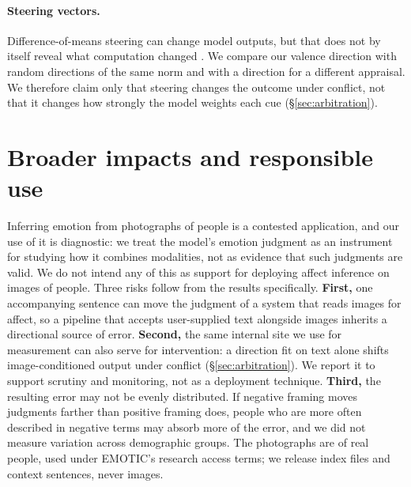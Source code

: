 \documentclass{article}
\begin{document}
\paragraph{Steering vectors.}
Difference-of-means steering can change model outputs, but that does not by itself reveal what computation changed \citep{steeringunreliability2025, steeringnonident2026}. We compare our valence direction with random directions of the same norm and with a direction for a different appraisal. We therefore claim only that steering changes the outcome under conflict, not that it changes how strongly the model weights each cue (\S\ref{sec:arbitration}).



\section{Broader impacts and responsible use}
\label{app:impacts}

Inferring emotion from photographs of people is a contested application, and our use of it is diagnostic: we treat the model's emotion judgment as an instrument for studying how it combines modalities, not as evidence that such judgments are valid. We do not intend any of this as support for deploying affect inference on images of people. Three risks follow from the results specifically. \textbf{First,} one accompanying sentence can move the judgment of a system that reads images for affect, so a pipeline that accepts user-supplied text alongside images inherits a directional source of error. \textbf{Second,} the same internal site we use for measurement can also serve for intervention: a direction fit on text alone shifts image-conditioned output under conflict (\S\ref{sec:arbitration}). We report it to support scrutiny and monitoring, not as a deployment technique. \textbf{Third,} the resulting error may not be evenly distributed. If negative framing moves judgments farther than positive framing does, people who are more often described in negative terms may absorb more of the error, and we did not measure variation across demographic groups. The photographs are of real people, used under EMOTIC's research access terms; we release index files and context sentences, never images.
\end{document}
